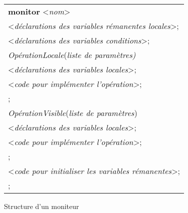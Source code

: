 \begin{figure}[!ht]

\begin{center}
\begin{tabular}{l}
{\bf monitor} <{\em nom}> \\
\hspace{0.3cm}<{\em déclarations des variables rémanentes locales}>; \\
\hspace{0.3cm}<{\em déclarations des variables conditions}>;  \\
\hspace{0.3cm}{\bf procedure} {\em OpérationLocale}({\em liste de paramètres)}  \\
\hspace{0.6cm}<{\em déclarations des variables locales}>; \\
\hspace{0.6cm}{\bf begin} <{\em code pour implémenter l'opération}>; \\
\hspace{0.6cm}{\bf end}; \\
\hspace{0.3cm}{\bf entry procedure} {\em OpérationVisible}({\em liste de paramètres}) \\
\hspace{0.6cm}<{\em déclarations des variables locales}>; \\
\hspace{0.6cm}{\bf begin} <{\em code pour implémenter l'opération}>; \\
\hspace{0.6cm}{\bf end}; \\
\hspace{0.3cm}{\bf begin} <{\em code pour initialiser les variables rémanentes}>; \\
\hspace{0.3cm}{\bf end};
\end{tabular}
\caption{\label{moniteur:struct}Structure d'un moniteur}
\end{center}
\end{figure}

